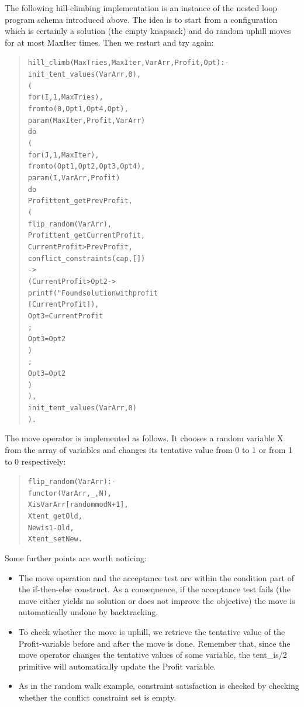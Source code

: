 The following hill-climbing implementation is an instance of the nested
loop program schema introduced above.  The idea is to start from
a configuration which is certainly a solution (the empty knapsack)
and do random uphill moves for at most MaxIter times. Then we restart
and try again:
\begin{quote}\begin{alltt}
hill_climb(MaxTries, MaxIter, VarArr, Profit, Opt) :-
        init_tent_values(VarArr, 0),            %
        (
            for(I,1,MaxTries),
            fromto(0, Opt1, Opt4, Opt),
            param(MaxIter,Profit,VarArr)
        do
            (
                for(J,1,MaxIter),
                fromto(Opt1, Opt2, Opt3, Opt4),
                param(I,VarArr,Profit)
            do
                Profit tent_get PrevProfit,
                (
                    flip_random(VarArr),        %
                    Profit tent_get CurrentProfit,
                    CurrentProfit > PrevProfit, %
                    conflict_constraints(cap,[])  %
                ->
                    ( CurrentProfit > Opt2 ->   %
                        printf("Found solution with profit %
                                    [CurrentProfit]),
                        Opt3=CurrentProfit      %
                    ;
                        Opt3=Opt2               %
                    )
                ;
                    Opt3=Opt2                   %
                )
            ),
            init_tent_values(VarArr, 0)         %
        ).
\end{alltt}\end{quote}
The move operator is implemented as follows. It chooses a random variable X
from the array of variables and changes its tentative value from 0 to 1
or from 1 to 0 respectively:
\begin{quote}\begin{alltt}
flip_random(VarArr) :-
        functor(VarArr, _, N),
        X is VarArr[random mod N + 1],
        X tent_get Old,
        New is 1-Old,
        X tent_set New.
\end{alltt}\end{quote}
Some further points are worth noticing:
\begin{itemize}
\item The move operation and the acceptance test
are within the condition part of the if-then-else construct.
As a consequence, if the acceptance test fails (the move either yields
no solution or does not improve the objective) the move is automatically
undone by backtracking.
\item To check whether the move is uphill, we retrieve the tentative
value of the Profit-variable before and after the move is done. 
Remember that, since the move operator changes the tentative values of
some variable, the tent\_is/2 primitive will automatically
update the Profit variable.
\item As in the random walk example, constraint satisfaction is checked
by checking whether the conflict constraint set is empty.
\end{itemize}

